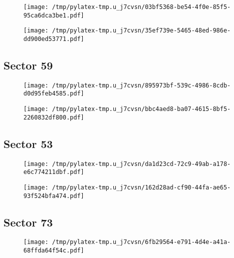 \documentclass{report}%
\begin{document}
\begin{figure}[H]%
\centering%
\centering%
\texttt{[image: /tmp/pylatex-tmp.u\_j7cvsn/03bf5368-be54-4f0e-85f5-95ca6dca3be1.pdf]}%
\end{figure}

%


\begin{figure}[H]%
\centering%
\texttt{[image: /tmp/pylatex-tmp.u\_j7cvsn/35ef739e-5465-48ed-986e-dd900ed53771.pdf]}%
\end{figure}

%
\subsection{Sector 59}%
\label{subsec:40298066459}%


\begin{figure}[H]%
\centering%
\centering%
\texttt{[image: /tmp/pylatex-tmp.u\_j7cvsn/895973bf-539c-4986-8cdb-d0d95feb4585.pdf]}%
\end{figure}

%


\begin{figure}[H]%
\centering%
\texttt{[image: /tmp/pylatex-tmp.u\_j7cvsn/bbc4aed8-ba07-4615-8bf5-2260832df800.pdf]}%
\end{figure}

%
\subsection{Sector 53}%
\label{subsec:40298066453}%


\begin{figure}[H]%
\centering%
\centering%
\texttt{[image: /tmp/pylatex-tmp.u\_j7cvsn/da1d23cd-72c9-49ab-a178-e6c774211dbf.pdf]}%
\end{figure}

%


\begin{figure}[H]%
\centering%
\texttt{[image: /tmp/pylatex-tmp.u\_j7cvsn/162d28ad-cf90-44fa-ae65-93f524bfa474.pdf]}%
\end{figure}

%
\subsection{Sector 73}%
\label{subsec:40298066473}%


\begin{figure}[H]%
\centering%
\centering%
\texttt{[image: /tmp/pylatex-tmp.u\_j7cvsn/6fb29564-e791-4d4e-a41a-68ffda64f54c.pdf]}%
\end{figure}
\end{document}
